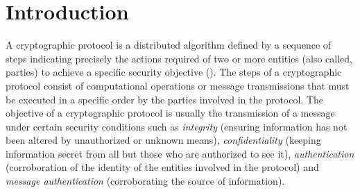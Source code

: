 \documentclass[10pt,conference]{IEEEtran}
\def\disgrace{DISCERN}
\begin{document}
\begin{abstract}



\end{abstract}





\section{Introduction}
\label{se:introduction}

A cryptographic protocol is a distributed algorithm defined by a
sequence of steps indicating precisely the actions required of two or
more entities (also called, parties) to achieve a specific security
objective (\cite{handbook}). The steps of a cryptographic protocol
consist of computational operations or message transmissions that must
be executed in a specific order by the parties involved in the
protocol. The objective of a cryptographic protocol is usually the
transmission of a message under certain security conditions such as
{\em integrity} (ensuring information has not been altered by
unauthorized or unknown means), {\em confidentiality} (keeping
information secret from all but those who are authorized to see it),
{\em authentication} (corroboration of the identity of the entities
involved in the protocol) and {\em message authentication}
(corroborating the source of information).
\end{document}
